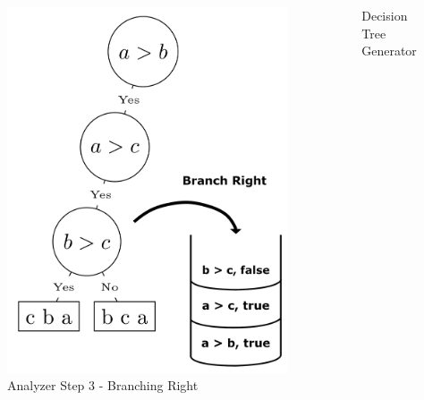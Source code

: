 \documentclass[final]{beamer}
\newlength{\sepwid}
\newlength{\onecolwid}
\newlength{\twocolwid}
\newlength{\onecolwidmid}
\begin{document}
\begin{frame}[t]
\begin{columns}[t]
\begin{column}{\twocolwid}
\begin{columns}[t,totalwidth=\twocolwid]
\begin{column}{\onecolwidmid}
\begin{figure}
\includegraphics[width=0.8\linewidth]{figures/bubble_sort_step_3_formatted.png}
\caption{Analyzer Step 3 - Branching Right}
\label{analyzer:3}
\end{figure}


\end{column} %

\end{columns} %

\end{column} %

\begin{column}{\sepwid}\end{column} %

\begin{column}{\onecolwid} %


\begin{block}{Decision Tree Generator}


\end{block}
\end{column}
\end{columns}
\end{frame}
\end{document}
